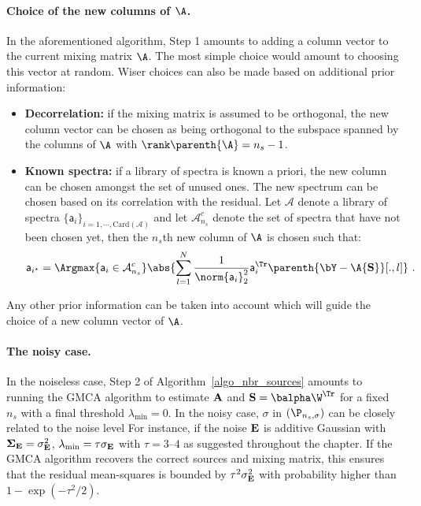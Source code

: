 \paragraph*{Choice of the new columns of $\A$.}
In the aforementioned algorithm, Step 1 amounts to adding a column vector to the current mixing matrix $\A$. The most simple choice would amount to choosing this vector at random. Wiser choices can also be made based on additional prior information:
\begin{itemize}
\item{\bf Decorrelation:} if the mixing matrix is assumed to be orthogonal, the new column vector can be chosen as being orthogonal to the subspace spanned by the columns of $\A$ with $\rank\parenth{\A} = n_s-1$.
\item{\bf Known spectra:} if a library of spectra is known a priori, the new column can be chosen amongst the set of unused ones. The new spectrum can be chosen based on its correlation with the residual. Let $\mathcal{A}$ denote a library of spectra $\{\mathsf{a}_i\}_{i = 1,\cdots,\mbox{Card}\left(\mathcal{A}\right)}$ and let $\mathcal{A}_{n_s}^c$ denote the set of spectra that have not been chosen yet, then the $n_s$th new column of $\A$ is chosen such that:
\begin{equation}
\mathsf{a}_{i^\star} = \Argmax{\mathsf{a}_i \in \mathcal{A}_{n_s}^c} \abs{\sum_{l=1}^{N} \frac{1}{\norm{\mathsf{a}_i}_2^2}\mathsf{a}_i^\Tr\parenth{{\bY} - {\A {\bf S}}}[.,l]} ~ .
\end{equation}
\end{itemize}
Any other prior information can be taken into account which will guide the choice of a new column vector of $\A$.

\paragraph*{The noisy case.}
In the noiseless case, Step 2 of Algorithm~\ref{algo_nbr_sources} amounts to running the GMCA algorithm to estimate $\bf A$ and ${\bf S} = \balpha \W^\Tr$ for a fixed $n_s$ with a final threshold $\lambda_{\min} = 0$. In the noisy case, $\sigma$ in $(\P_{n_s,\sigma})$ can be closely related to the noise level For instance, if the noise $\bf E$ is additive Gaussian with ${\boldsymbol \Sigma}_{\bf E}=\sigma_{\bf E}^2$, $\lambda_{\min}=\tau\sigma_{\bf E}$ with $\tau=\text{3--4}$ as suggested throughout the chapter. If the GMCA algorithm recovers the correct sources and mixing matrix, this ensures that the residual mean-squares is bounded by $\tau^2\sigma_{\bf E}^2$ with probability higher than $1 - \exp(-\tau^2/2)$.

